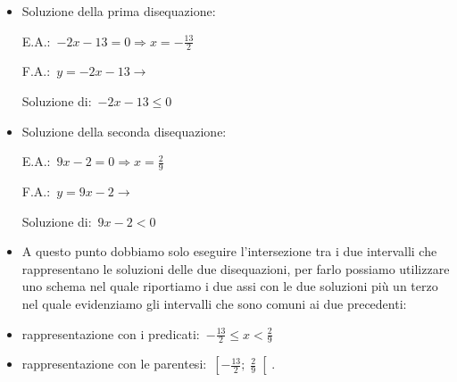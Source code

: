 \begin{esempio}
\begin{itemize} [noitemsep]
 \item Soluzione della prima disequazione:\\
 \begin{minipage}{.45\textwidth}
  E.A.:~$-2 x -13=0 \Rightarrow x=-\frac{13}{2}$
 \end{minipage}
 \begin{minipage}{.25\textwidth}
  F.A.:~$y=-2 x -13 \rightarrow $
 \end{minipage}
 \begin{minipage}{.3\textwidth}
  
 \end{minipage}
 \subitem
  \begin{minipage}{.40\textwidth}
   Soluzione di:~$-2 x -13 \le 0$
  \end{minipage}
  \begin{minipage}{.30\textwidth}
  
  \end{minipage}
 \item Soluzione della seconda disequazione:\\
 \begin{minipage}{.45\textwidth}
  E.A.:~$9 x -2=0 \Rightarrow x=\frac{2}{9}$
 \end{minipage}
 \begin{minipage}{.25\textwidth}
  F.A.:~$y=9 x -2 \rightarrow $
 \end{minipage}
 \begin{minipage}{.3\textwidth}
  
 \end{minipage}
 \subitem
  \begin{minipage}{.40\textwidth}
   Soluzione di:~$9 x -2 < 0$
  \end{minipage}
  \begin{minipage}{.30\textwidth}
  
  \end{minipage}
 \item A questo punto dobbiamo solo eseguire l'intersezione tra i due 
intervalli 
  che rappresentano le soluzioni delle due disequazioni, per farlo possiamo 
  utilizzare uno schema nel quale riportiamo i due assi con le due soluzioni 
  più un terzo nel quale evidenziamo gli intervalli che sono comuni ai due 
  precedenti: 
  
 \item rappresentazione con i predicati:~$-\frac{13}{2} \le x < \frac{2}{9}$ 
 \item rappresentazione con le parentesi:~$\left[-\frac{13}{2}; \; \frac{2}{9} 
\right[$. 
\end{itemize}
 \end{esempio}

